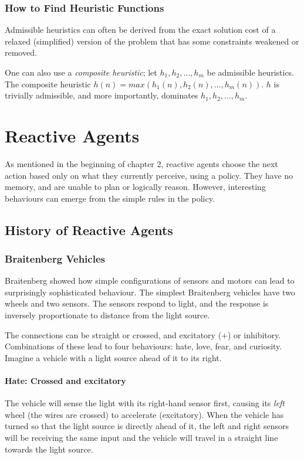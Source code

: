 \subsection{How to Find Heuristic Functions}
Admissible heuristics can often be derived from the exact solution cost of a
relaxed (simplified) version of the problem that has some constraints weakened
or removed.

One can also use a \textit{composite heuristic}; let $h_1, h_2, \ldots, h_m$ be
admissible heuristics. The composite heuristic $h(n) = max(h_{1}(n), h_{2}(n),
\ldots, h_{m}(n))$. $h$ is trivially admissible, and more importantly,
dominates $h_1, h_2, \ldots, h_m$.

\chapter{Reactive Agents}
As mentioned in the beginning of chapter 2, reactive agents choose the next
action based only on what they currently perceive, using a policy. They have no
memory, and are unable to plan or logically reason. However, interesting
behaviours can emerge from the simple rules in the policy.

\section{History of Reactive Agents}
\subsection{Braitenberg Vehicles}
Braitenberg showed how simple configurations of sensors and motors can lead to
surprisingly sophisticated behaviour. The simplest Braitenberg vehicles have
two wheels and two sensors. The sensors respond to light, and the response is
inversely proportionate to distance from the light source.

The connections can be straight or crossed, and excitatory ($+$) or inhibitory.
Combinations of these lead to four behaviours: hate, love, fear, and curiosity.
Imagine a vehicle with a light source ahead of it to its right.
\subsubsection{Hate: Crossed and excitatory}
The vehicle will sense the light with its right-hand sensor first, causing its
\textit{left} wheel (the wires are crossed) to accelerate (excitatory). When
the vehicle has turned so that the light source is directly ahead of it, the
left and right sensors will be receiving the same input and the vehicle will
travel in a straight line towards the light source.

